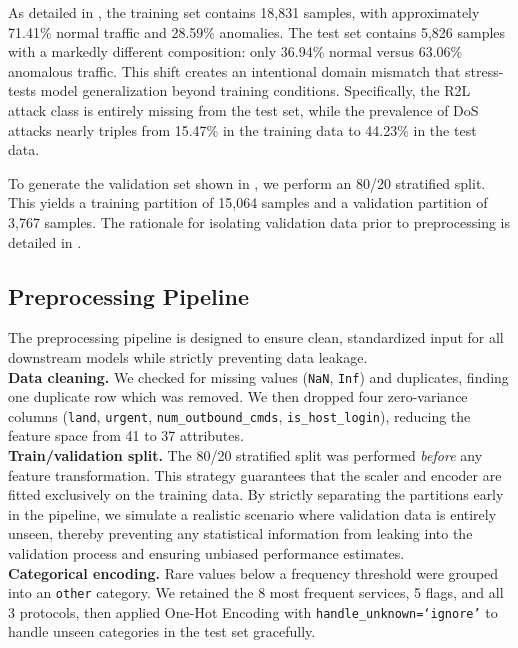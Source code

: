     As detailed in , the training set contains 18,831 samples, with approximately 71.41\% normal traffic and 28.59\% anomalies.
    The test set contains 5,826 samples with a markedly different composition: only 36.94\% normal versus 63.06\% anomalous traffic.
    This shift creates an intentional domain mismatch that stress-tests model generalization beyond training conditions.
    Specifically, the R2L attack class is entirely missing from the test set, while the prevalence of DoS attacks nearly triples from 15.47\% in the training data to 44.23\% in the test data.

    To generate the validation set shown in , we perform an 80/20 stratified split. This yields a training partition of 15,064 samples and a validation partition of 3,767 samples. The rationale for isolating validation data prior to preprocessing is detailed in .

\subsection{Preprocessing Pipeline} \label{sec:preprocessing}

    The preprocessing pipeline is designed to ensure clean, standardized input for all downstream models while strictly preventing data leakage. \\

    \noindent
    \textbf{Data cleaning.} We checked for missing values (\texttt{NaN}, \texttt{Inf}) and duplicates, finding one duplicate row which was removed.
    We then dropped four zero-variance columns (\texttt{land}, \texttt{urgent}, \texttt{num\_outbound\_cmds}, \texttt{is\_host\_login}), reducing the feature space from 41 to 37 attributes. \\

    \noindent
    \textbf{Train/validation split.} The 80/20 stratified split was performed \emph{before} any feature transformation. 
    This strategy guarantees that the scaler and encoder are fitted exclusively on the training data. 
    By strictly separating the partitions early in the pipeline, we simulate a realistic scenario where validation data is entirely unseen, thereby preventing any statistical information from leaking into the validation process and ensuring unbiased performance estimates. \\

    \noindent
    \textbf{Categorical encoding.} Rare values below a frequency threshold were grouped into an \texttt{other} category.
    We retained the 8 most frequent services, 5 flags, and all 3 protocols, then applied One-Hot Encoding with \texttt{handle\_unknown=`ignore'} to handle unseen categories in the test set gracefully. \\
    
